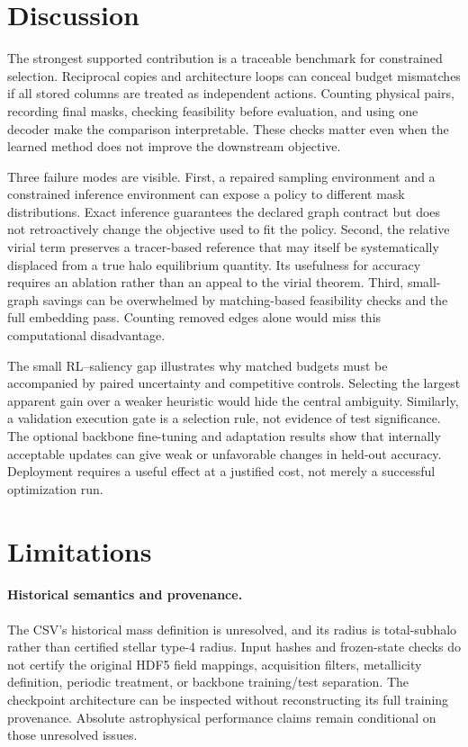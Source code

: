\section{Discussion}
The strongest supported contribution is a traceable benchmark for constrained selection. Reciprocal copies and architecture loops can conceal budget mismatches if all stored columns are treated as independent actions. Counting physical pairs, recording final masks, checking feasibility before evaluation, and using one decoder make the comparison interpretable. These checks matter even when the learned method does not improve the downstream objective.

Three failure modes are visible. First, a repaired sampling environment and a constrained inference environment can expose a policy to different mask distributions. Exact inference guarantees the declared graph contract but does not retroactively change the objective used to fit the policy. Second, the relative virial term preserves a tracer-based reference that may itself be systematically displaced from a true halo equilibrium quantity. Its usefulness for accuracy requires an ablation rather than an appeal to the virial theorem. Third, small-graph savings can be overwhelmed by matching-based feasibility checks and the full embedding pass. Counting removed edges alone would miss this computational disadvantage.

The small RL--saliency gap illustrates why matched budgets must be accompanied by paired uncertainty and competitive controls. Selecting the largest apparent gain over a weaker heuristic would hide the central ambiguity. Similarly, a validation execution gate is a selection rule, not evidence of test significance. The optional backbone fine-tuning and adaptation results show that internally acceptable updates can give weak or unfavorable changes in held-out accuracy. Deployment requires a useful effect at a justified cost, not merely a successful optimization run.

\section{Limitations}
\label{sec:limitations}
\paragraph{Historical semantics and provenance.}
The CSV's historical mass definition is unresolved, and its radius is total-subhalo rather than certified stellar type-4 radius. Input hashes and frozen-state checks do not certify the original HDF5 field mappings, acquisition filters, metallicity definition, periodic treatment, or backbone training/test separation. The checkpoint architecture can be inspected without reconstructing its full training provenance. Absolute astrophysical performance claims remain conditional on those unresolved issues.

